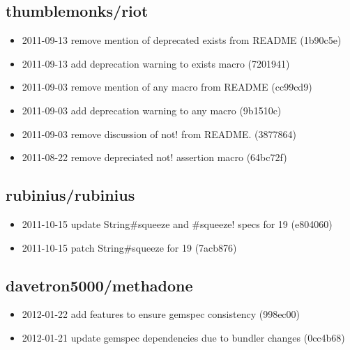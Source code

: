 \documentclass{article}
\begin{document}
\begin{multicols}{2}
  \begin{raggedright}
  \subsection{thumblemonks/riot} %
  \label{sub:thumblemonks/riot}

  \begin{itemize}
    \item2011-09-13 remove mention of deprecated exists from README (1b90c5e)
    \item2011-09-13 add deprecation warning to exists macro (7201941)
    \item2011-09-03 remove mention of any macro from README (cc99cd9)
    \item2011-09-03 add deprecation warning to any macro (9b1510c)
    \item2011-09-03 remove discussion of not! from README. (3877864)
    \item2011-08-22 remove depreciated not! assertion macro (64bc72f)
  \end{itemize}

  \subsection{rubinius/rubinius} %
  \label{sub:rubinius/rubinius}

  \begin{itemize}
    \item2011-10-15 update String#squeeze and #squeeze! specs for 19 (e804060)
    \item2011-10-15 patch String#squeeze for 19 (7acb876)
  \end{itemize}
  
  \subsection{davetron5000/methadone} %
  \label{sub:davetron5000/methadone}
  
  \begin{itemize}
    \item2012-01-22 add features to ensure gemspec consistency (998ec00)
    \item2012-01-21 update gemspec dependencies due to bundler changes (0cc4b68)
  \end{itemize}

  \end{raggedright}
\end{multicols}

\end{document}
